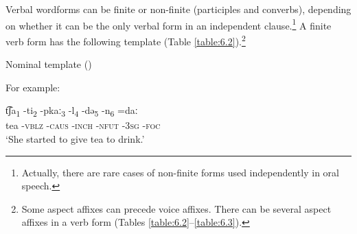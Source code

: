 \documentclass[output=paper,colorlinks,citecolor=brown]{langscibook}
\begin{document}
Verbal wordforms can be finite or non-finite (participles and converbs), depending on whether it can be the only verbal form in an independent clause.\footnote{Actually, there are rare cases of non-finite forms used independently in oral speech.} A finite verb form has the following template (Table \ref{table:6.2}).\footnote{Some aspect affixes can precede voice affixes. There can be several aspect affixes in a verb form (Tables \ref{table:6.2}--\ref{table:6.3}).}

\begin{table}
\captionsetup{margin=.025\linewidth}
\begin{floatrow}
{\caption{Nominal template (\citealt[15]{BulatovaGrenoble1999})\label{table:6.1}}}

{\caption{Finite verbal template (\citealt[27]{BulatovaGrenoble1999})\label{table:6.2}}}
\end{floatrow}
\end{table}


\noindent For example:

\ea
    \label{example6.3}
    \gll t͡ʃa\textsubscript{1}{ }	-ti\textsubscript{2}{ }	-pkaː\textsubscript{3}{ }	-l\textsubscript{4}{ }	-də\textsubscript{5}{ }	-n\textsubscript{6}{ }	=daː\\
    tea	\textsc{-vblz}	\textsc{-caus}	\textsc{-inch}	\textsc{-nfut}	-3\textsc{sg}	\textsc{-foc}\\
    \glt `She started to give tea to drink.'\\
    \z
\end{document}
